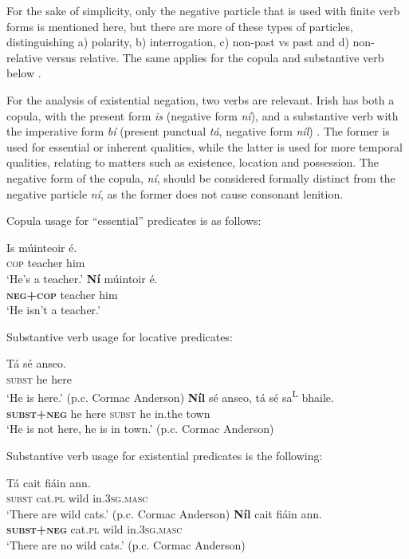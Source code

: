 ﻿\documentclass[output=paper]{langsci/langscibook}
\begin{document}
\begin{unindented}
For the sake of simplicity, only the negative particle that is used with
finite verb forms is mentioned here, but there are more of these types of
particles, distinguishing a) polarity, b) interrogation, c) non-past vs
past and d) non-relative versus relative. The same applies for the copula
and substantive verb below \parencite[see][93]{Stenson1981}. 

For the analysis of existential negation, two verbs are relevant. Irish has both a copula, with the present form \textit{is} (negative form \textit{ní}), and a substantive verb with the imperative form \textit{bí} (present punctual \textit{tá}, negative form \textit{níl}) \citep[94]{Stenson1981}. The former is used for essential or inherent qualities, while the latter is used for more temporal qualities, relating to matters such as existence, location and possession. The negative form of the copula, \textit{ní}, should be considered formally distinct from the negative particle \textit{ní}, as the former does not cause consonant lenition. 

Copula usage for ``essential'' predicates is as follows:
%
\begin{exe}\ex \gll Is múinteoir é.  \\
\textsc{cop} teacher him \\
    \glt `He's a teacher.' \citep[132]{Stenson1981}
\ex \gll \textbf{Ní} múintoir é.  \\
\textbf{\textsc{neg+cop}} teacher   him \\
    \glt `He isn't a teacher.' \citep[132]{Stenson1981}
    \end{exe}

Substantive verb usage for locative predicates:
%
\begin{exe}\ex \gll Tá sé anseo. \\
\textsc{subst} he here \\
    \glt `He is here.' (p.c. Cormac Anderson)
\ex \gll \textbf{Níl} sé anseo,  tá sé sa\textsuperscript{L} bhaile. \\
\textbf{\textsc{subst+neg}} he here \textsc{subst} he in.the  town \\
    \glt `He is not here, he is in town.' (p.c. Cormac Anderson)
    \end{exe}

Substantive verb usage for existential predicates is the following:
%
\begin{exe}\ex \gll Tá cait    fiáin ann. \\
\textsc{subst} cat.\textsc{pl} wild in.\textsc{3sg.masc} \\
    \glt `There are wild cats.' (p.c. Cormac Anderson)
\ex \gll \textbf{Níl} cait   fiáin ann. \\
\textbf{\textsc{subst+neg}} cat.\textsc{pl} wild in.\textsc{3sg.masc} \\
    \glt `There are no wild cats.' (p.c. Cormac Anderson)
    \end{exe}


\end{unindented}
\end{document}
